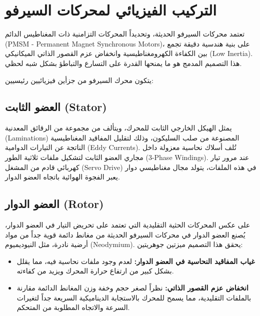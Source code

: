 \section{التركيب الفيزيائي لمحركات السيرفو}
\label{sec:physical_structure}

تعتمد محركات السيرفو الحديثة، وتحديداً المحركات التزامنية ذات المغناطيس الدائم (\textenglish{PMSM - Permanent Magnet Synchronous Motors})، على بنية هندسية دقيقة تجمع بين الكفاءة الكهرومغناطيسية وانخفاض عزم القصور الذاتي الميكانيكي (\textenglish{Low Inertia}). هذا التصميم المدمج هو ما يمنحها القدرة على التسارع والتباطؤ بشكل شبه لحظي.

يتكون محرك السيرفو من جزأين فيزيائيين رئيسيين:

\subsection{العضو الثابت (\textenglish{Stator})}
يمثل الهيكل الخارجي الثابت للمحرك، ويتألف من مجموعة من الرقائق المعدنية (\textenglish{Laminations}) المصنوعة من صلب السليكون، وذلك لتقليل المفاقيد المغناطيسية الناتجة عن التيارات الدوامية (\textenglish{Eddy Currents}). تُلف أسلاك نحاسية معزولة داخل مجاري العضو الثابت لتشكيل ملفات ثلاثية الطور (\textenglish{3-Phase Windings}). عند مرور تيار كهربائي قادم من المشغل (\textenglish{Servo Drive}) في هذه الملفات، يتولد مجال مغناطيسي دوار يعبر الفجوة الهوائية باتجاه العضو الدوار.

\subsection{العضو الدوار (\textenglish{Rotor})}
على عكس المحركات الحثية التقليدية التي تعتمد على تحريض التيار في العضو الدوار، يُصنع العضو الدوار في محركات السيرفو الحديثة من مغانط دائمة قوية جداً من مواد أرضية نادرة، مثل النيوديميوم (\textenglish{Neodymium}). يحقق هذا التصميم ميزتين جوهريتين:
\begin{itemize}
    \item \textbf{غياب المفاقيد النحاسية في العضو الدوار:} لعدم وجود ملفات نحاسية فيه، مما يقلل بشكل كبير من ارتفاع حرارة المحرك ويزيد من كفاءته.
    \item \textbf{انخفاض عزم القصور الذاتي:} نظراً لصغر حجم وخفة وزن المغانط الدائمة مقارنة بالملفات التقليدية، مما يسمح للمحرك بالاستجابة الديناميكية السريعة جداً لتغيرات السرعة والاتجاه المطلوبة من المتحكم.
\end{itemize}

